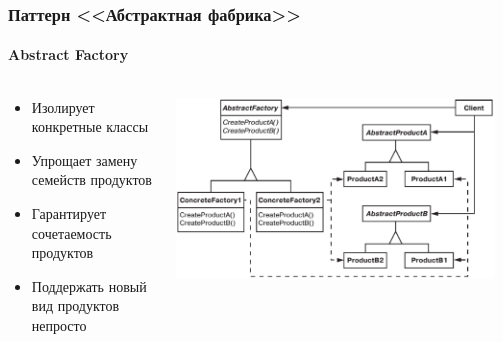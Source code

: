 \documentclass[xetex,mathserif,serif]{beamer}
\begin{document}
    \begin{frame}
        \frametitle{Паттерн <<Абстрактная фабрика>>}
        \framesubtitle{Abstract Factory}
        \begin{columns}
            \begin{column}{0.4\textwidth}
                \begin{itemize}
                    \item Изолирует конкретные классы
                    \item Упрощает замену семейств продуктов
                    \item Гарантирует сочетаемость продуктов
                    \item Поддержать новый вид продуктов непросто
                \end{itemize}
            \end{column}
            \begin{column}{0.6\textwidth}
                \begin{center}
                    \includegraphics[width=0.95\textwidth]{abstractFactory.png}
                \end{center}
            \end{column}
        \end{columns}
    \end{frame}
\end{document}
